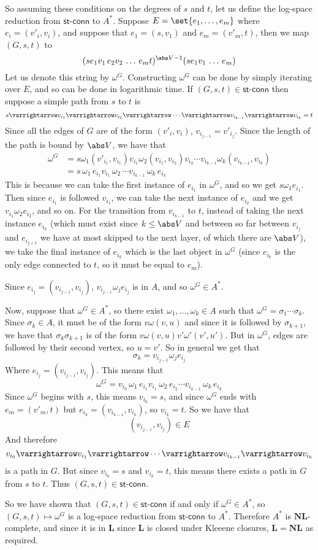 \documentclass[10pt]{article}
\let\to=\varrightarrow
\def\stconn{\textsf{st-conn}}
\def\L{\mathbf{L}}
\def\NL{\mathbf{NL}}
\begin{document}
    So assuming these conditions on the degrees of $s$ and $t$, let us define the log-space reduction from $\stconn$ to $A^*$.
    Suppose $E=\set{e_1,\dots,e_m}$ where $e_i=(v'_i,v_i)$, and suppose that $e_1=(s,v_1)$ and $e_m=(v'_m,t)$, then we map $(G,s,t)$ to
    \[ (se_1v_1\,e_2v_2\,\dots\,e_mt)^{\abs V-1}(se_1v_1\,\dots\,e_m) \]
    Let us denote this string by $\omega^G$.
    Constructing $\omega^G$ can be done by simply iterating over $E$, and so can be done in logarithmic time.
    If $(G,s,t)\in\stconn$ then suppose a simple path from $s$ to $t$ is
    \[ s \to v_{i_1} \to v_{i_2} \to \cdots \to v_{i_{k-1}} \to v_{i_k} = t \]
    Since all the edges of $G$ are of the form $(v'_i,v_i)$, $v_{i_{j-1}}=v'_{i_j}$.
    Since the length of the path is bound by $\abs V$, we have that
    \begin{align*}
        \omega^G &= s\omega_1(v'_{i_1},v_{i_1})v_{i_1}\omega_2(v_{i_1},v_{i_2})v_{i_2}\cdots v_{i_{k-1}}\omega_k(v_{i_{k-1}},v_{i_k}) \\
                 &= s\,\omega_1\,e_{i_1}v_{i_1}\,\omega_2\,\cdots v_{i_{k-1}}\,\omega_k\,e_{i_k}
    \end{align*}
    This is because we can take the first instance of $e_{i_1}$ in $\omega^G$, and so we get $s\omega_1 e_{i_1}$.
    Then since $e_{i_1}$ is followed $v_{i_1}$, we can take the next instance of $e_{i_2}$ and we get $v_{i_1}\omega_2 e_{i_2}$, and so on.
    For the transition from $v_{i_{k-1}}$ to $t$, instead of taking the next instance $e_{i_k}$ (which must exist since $k\leq\abs V$ and between so far between $v_{i_j}$ and $e_{i_{j+1}}$ we have at most
    skipped to the next layer, of which there are $\abs V$), we take the final instance of $e_{i_k}$ which is the last object in $\omega^G$ (since $e_{i_k}$ is the only edge connected to $t$, so it must be
    equal to $e_m$).

    Since $e_{i_j}=(v_{i_{j-1}},v_{i_j})$, $v_{i_{j-1}}\omega_j e_{i_j}$ is in $A$, and so $\omega^G\in A^*$.

    Now, suppose that $\omega^G\in A^*$, so there exist $\omega_1,\dots,\omega_k\in A$ such that $\omega^G=\sigma_1\cdots\sigma_k$.
    Since $\sigma_k\in A$, it must be of the form $v\omega(v,u)$ and since it is followed by $\sigma_{k+1}$, we have that $\sigma_k\sigma_{k+1}$ is of the form $v\omega(v,u)v'\omega'(v',u')$.
    But in $\omega^G$, edges are followed by their second vertex, so $u=v'$.
    So in general we get that
    \[ \sigma_k = v_{i_{j-1}}\omega_j e_{i_j} \]
    Where $e_{i_j}=(v_{i_{j-1}},v_{i_j})$.
    This means that
    \[ \omega^G = v_{i_0}\,\omega_1\,e_{i_1}v_{i_1}\,\omega_2\,e_{i_2}\cdots v_{i_{k-1}}\,\omega_k\,e_{i_k} \]
    Since $\omega^G$ begins with $s$, this means $v_{i_0}=s$, and since $\omega^G$ ends with $e_m=(v'_m,t)$ but $e_{i_k}=(v_{i_{k-1}},v_{i_k})$, so $v_{i_k}=t$.
    So we have that
    \[ (v_{i_{j-1}},v_{i_j}) \in E \]
    And therefore
    \[ v_{i_0} \to v_{i_1} \to \cdots \to v_{i_{k-1}} \to v_{i_k} \]
    is a path in $G$.
    But since $v_{i_0}=s$ and $v_{i_k}=t$, this means there exists a path in $G$ from $s$ to $t$.
    Thus $(G,s,t)\in\stconn$.

    So we have shown that $(G,s,t)\in\stconn$ if and only if $\omega^G\in A^*$, so $(G,s,t)\mapsto\omega^G$ is a log-space reduction from $\stconn$ to $A^*$.
    Therefore $A^*$ is $\NL$-complete, and since it is in $\L$ since $\L$ is closed under Kleeene closures, $\L=\NL$ as required.

\eenum
\end{document}
